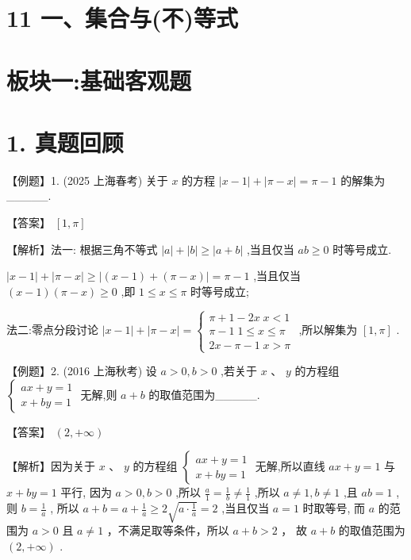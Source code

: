 \documentclass[10pt]{article}
\begin{document}
\section*{11 一、集合与(不)等式}

\section*{板块一:基础客观题}

\section*{1. 真题回顾}

【例题】1. (2025 上海春考) 关于 \(x\) 的方程 \(\left| {x - 1}\right|  + \left| {\pi  - x}\right|  = \pi  - 1\) 的解集为\_\_\_\_\_.

【答案】 \(\left\lbrack  {1,\pi }\right\rbrack\)

【解析】法一: 根据三角不等式 \(\left| a\right|  + \left| b\right|  \geq  \left| {a + b}\right|\) ,当且仅当 \({ab} \geq  0\) 时等号成立.

\(\left| {x - 1}\right|  + \left| {\pi  - x}\right|  \geq  \left| {\left( {x - 1}\right)  + \left( {\pi  - x}\right) }\right|  = \pi  - 1\) ,当且仅当 \(\left( {x - 1}\right) \left( {\pi  - x}\right)  \geq  0\) ,即 \(1 \leq  x \leq  \pi\) 时等号成立;

法二:零点分段讨论 \(\left| {x - 1}\right|  + \left| {\pi  - x}\right|  = \left\{  \begin{array}{l} \pi  + 1 - {2x}\;x < 1 \\  \pi  - 1\;1 \leq  x \leq  \pi \\  {2x} - \pi  - 1\;x > \pi  \end{array}\right.\) ,所以解集为 \(\left\lbrack  {1,\pi }\right\rbrack\) .

【例题】2. (2016 上海秋考) 设 \(a > 0,b > 0\) ,若关于 \(x\text{ 、 }y\) 的方程组 \(\left\{  \begin{array}{l} {ax} + y = 1 \\  x + {by} = 1 \end{array}\right.\) 无解,则 \(a + b\) 的取值范围为\_\_\_\_\_.

【答案】 \(\left( {2, + \infty }\right)\)

【解析】因为关于 \(x\text{ 、 }y\) 的方程组 \(\left\{  \begin{array}{l} {ax} + y = 1 \\  x + {by} = 1 \end{array}\right.\) 无解,所以直线 \({ax} + y = 1\) 与 \(x + {by} = 1\) 平行, 因为 \(a > 0,b > 0\) ,所以 \(\frac{a}{1} = \frac{1}{b} \neq  \frac{1}{1}\) ,所以 \(a \neq  1,b \neq  1\) ,且 \({ab} = 1\) ,则 \(b = \frac{1}{a}\) , 所以 \(a + b = a + \frac{1}{a} \geq  2\sqrt{a \cdot  \frac{1}{a}} = 2\) ,当且仅当 \(a = 1\) 时取等号, 而 \(a\) 的范围为 \(a > 0\) 且 \(a \neq  1\) ，不满足取等条件，所以 \(a + b > 2\) ， 故 \(a + b\) 的取值范围为 \(\left( {2, + \infty }\right)\) .
\end{document}
